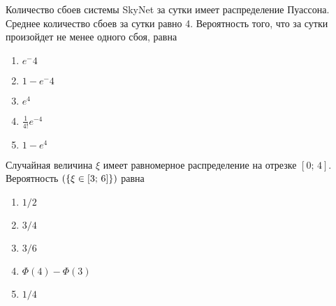 \documentclass[t]{beamer}
\let\P\relax
\DeclareMathOperator{\P}{\mathbb{P}}
\begin{document}
 \begin{frame} \label{28} 
\begin{block}{28} 

Количество сбоев системы SkyNet за сутки имеет распределение Пуассона. Среднее количество сбоев за сутки равно 4. Вероятность того, что за сутки произойдет не менее одного сбоя, равна
  


 \end{block} 
\begin{enumerate} 
\item[] \hyperlink{28-No}{\beamergotobutton{}  $e^-4$ }
\item[] \hyperlink{28-Yes}{\beamergotobutton{}  $1- e^-4$ }
\item[] \hyperlink{28-No}{\beamergotobutton{}  $e^4$ }
\item[] \hyperlink{28-No}{\beamergotobutton{}  $\tfrac{1}{4!}e^{-4}$}
\item[] \hyperlink{28-No}{\beamergotobutton{}  $1-e^4$ }
\end{enumerate} 
\end{frame} 


 \begin{frame} \label{29} 
\begin{block}{29} 

Случайная величина $\xi$ имеет равномерное распределение на отрезке $[0;\,4]$. Вероятность $\P(\{\xi \in [3;\,6]\})$ равна
  


 \end{block} 
\begin{enumerate} 
\item[] \hyperlink{29-No}{\beamergotobutton{}  $1/2$ }
\item[] \hyperlink{29-No}{\beamergotobutton{}  $3/4$ }
\item[] \hyperlink{29-No}{\beamergotobutton{}  $3/6$ }
\item[] \hyperlink{29-No}{\beamergotobutton{}  $\Phi(4) - \Phi(3)$  }
\item[] \hyperlink{29-Yes}{\beamergotobutton{}  $1/4$ }
\end{enumerate} 
\end{frame} 
\end{document}
